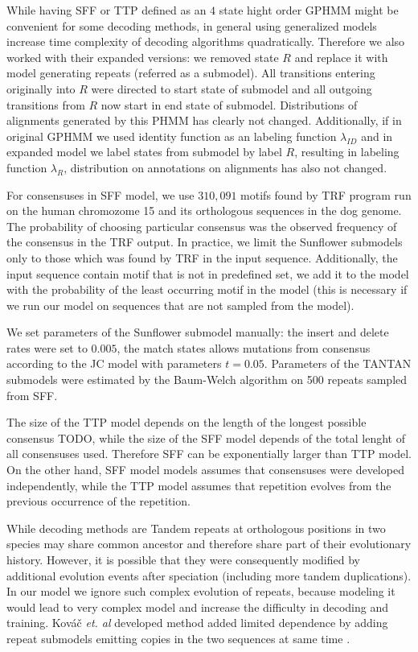 While having SFF or TTP defined as an $4$ state hight order GPHMM might be
convenient for some decoding methods, in general using generalized models
increase time complexity of decoding algorithms quadratically. Therefore we
also worked with their expanded versions: we removed state $R$ and replace it
with model generating repeats (referred as a submodel). All transitions
entering originally into $R$ were directed to start state of submodel and all
outgoing transitions from $R$ now start in end state of submodel. Distributions
of alignments generated by this PHMM has clearly not changed. Additionally, if
in original GPHMM we used identity function as an labeling function
$\lambda_{ID}$ and in expanded model we label states from submodel by label
$R$, resulting in labeling function $\lambda_R$, distribution on annotations
on alignments has also not changed. 

For consensuses in SFF model, we use $310,091$ motifs found by TRF program run
on the human chromozome 15 and its orthologous sequences in the dog genome. The
probability of choosing particular consensus was the observed frequency of the
consensus in the TRF output. In practice, we limit the Sunflower submodels only
to those which was found by TRF in the input sequence.  Additionally, the input
sequence contain motif that is not in predefined set, we add it to the model
with the probability of the least occurring motif in the model (this is necessary
if we run our model on sequences that are not sampled from the model).

We set parameters of the Sunflower submodel manually: the insert and delete
rates were set to $0.005$, the match states allows mutations from consensus
according to the JC model with parameters $t=0.05$.
Parameters of the TANTAN submodels were estimated by the Baum-Welch algorithm
\cite{Durbin1998} on 500 repeats sampled from SFF.

The size of the TTP model depends on the length of the longest possible
consensus TODO, while the size of the SFF model depends of the total lenght of
all consensuses used. Therefore SFF can be exponentially larger than TTP model.
On the other hand, SFF model models assumes that consensuses were developed
independently, while the TTP model assumes that repetition evolves from the
previous occurrence of the repetition.

While decoding methods are Tandem repeats at orthologous positions in two
species may share common ancestor and therefore share part of their evolutionary
history. However, it is possible that they were consequently modified by
additional evolution events after speciation (including more tandem
duplications). In our model we ignore such complex evolution of repeats, because
modeling it would lead to very complex model and increase the difficulty in
decoding and training. Kováč {\it et. al} developed method added limited
dependence by adding repeat submodels emitting copies in the two sequences at
same time \cite{Kovac2012}.



